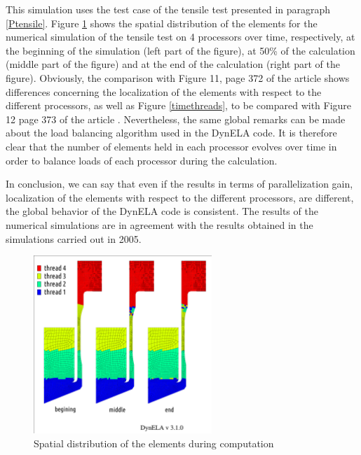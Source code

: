 This simulation uses the test case of the tensile test presented in paragraph \ref{Ptensile}. Figure \ref{spacethreads} shows the spatial distribution of the elements for the numerical simulation of the tensile test on 4 processors over time, respectively, at the beginning of the simulation (left part of the figure), at 50\% of the calculation (middle part of the figure) and at the end of the calculation (right part of the figure). Obviously, the comparison with Figure 11, page 372 of the article \cite{Pantale:2005} shows differences concerning the localization of the elements with respect to the different processors, as well as Figure \ref{timethreads}, to be compared with Figure 12 page 373 of the article \cite{Pantale:2005}. Nevertheless, the same global remarks can be made about the load balancing algorithm used in the DynELA code. It is therefore clear that the number of elements held in each processor evolves over time in order to balance loads of each processor during the calculation.

In conclusion, we can say that even if the results in terms of parallelization gain, localization of the elements with respect to the different processors, are different, the global behavior of the DynELA code is consistent. The results of the numerical simulations are in agreement with the results obtained in the simulations carried out in 2005.

\begin{figure}[h!] 
  \centering
  \includegraphics[width=0.6\textwidth]{./spacethreads.pdf}
  \caption{Spatial distribution of the elements during computation}
  \label{spacethreads}
\end{figure}

